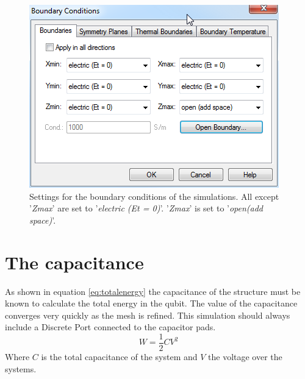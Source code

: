 \begin{figure}[h]
	\begin{center}
		\includegraphics[scale = .7]{Figures/Boundaries}
		\caption{Settings for the boundary conditions of the simulations. All except '\textit{Zmax}' are set to '\textit{electric (Et = 0)}'. '\textit{Zmax}' is set to '\textit{open(add space)}'.}
		\label{fig:Boundaries}
	\end{center}
\end{figure}

\section{The capacitance}
As shown in equation \eqref{eq:totalenergy} the capacitance of the structure must be known to calculate the total energy in the qubit. The value of the capacitance converges very quickly as the mesh is refined. This simulation should always include a Discrete Port connected to the capacitor pads.
\begin{equation} \label{eq:totalenergy}
W=\frac{1}{2}CV^{2}
\end{equation}
Where \(C\) is the total capacitance of the system and \(V\) the voltage over the systems.

% 
